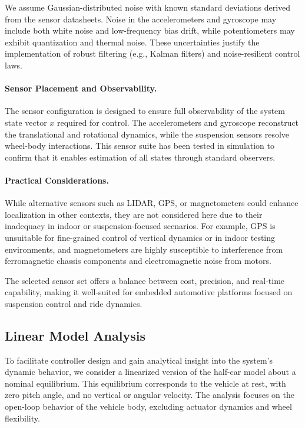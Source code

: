 \documentclass[]{report}
\begin{document}
We assume Gaussian-distributed noise with known standard deviations derived from the sensor datasheets. Noise in the accelerometers and gyroscope may include both white noise and low-frequency bias drift, while potentiometers may exhibit quantization and thermal noise. These uncertainties justify the implementation of robust filtering (e.g., Kalman filters) and noise-resilient control laws.

\paragraph{Sensor Placement and Observability.}
The sensor configuration is designed to ensure full observability of the system state vector $x$ required for control. The accelerometers and gyroscope reconstruct the translational and rotational dynamics, while the suspension sensors resolve wheel-body interactions. This sensor suite has been tested in simulation to confirm that it enables estimation of all states through standard observers.

\paragraph{Practical Considerations.}
While alternative sensors such as LIDAR, GPS, or magnetometers could enhance localization in other contexts, they are not considered here due to their inadequacy in indoor or suspension-focused scenarios. For example, GPS is unsuitable for fine-grained control of vertical dynamics or in indoor testing environments, and magnetometers are highly susceptible to interference from ferromagnetic chassis components and electromagnetic noise from motors.

The selected sensor set offers a balance between cost, precision, and real-time capability, making it well-suited for embedded automotive platforms focused on suspension control and ride dynamics.

\newpage

\subsection{Linear Model Analysis}

To facilitate controller design and gain analytical insight into the system's dynamic behavior, we consider a linearized version of the half-car model about a nominal equilibrium. This equilibrium corresponds to the vehicle at rest, with zero pitch angle, and no vertical or angular velocity. The analysis focuses on the open-loop behavior of the vehicle body, excluding actuator dynamics and wheel flexibility.
\end{document}
